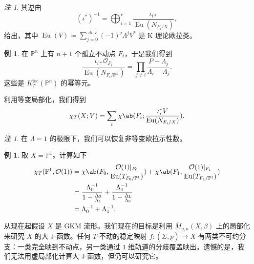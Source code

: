 \documentclass{amsart}
\theoremstyle{definition}
\newtheorem{exm}[thm]{例}
\theoremstyle{remark}
\newtheorem{rmk}[thm]{注}
\theoremstyle{plain}
\theoremstyle{definition}
\theoremstyle{remark}
\renewcommand{\P}{\mathbb{P}}
\newcommand{\mc}[1]{\mathcal{#1}}
\newcommand{\mr}[1]{\mathrm{#1}}
\newcommand{\on}[1]{\operatorname{#1}}
\newcommand{\ul}[1]{\underline{#1}}
\newcommand{\1}{\mathbf{1}}
\newcommand{\2}{\mathbf{2}}
\newcommand{\3}{\mathbf{3}}
\newcommand{\loc}{\mr{loc}}
\begin{document}
\begin{rmk}
    其逆由
    \[ (\iota^*)^{-1} = \bigoplus_{i=1}^r \frac{\iota_{i*}}{\on{Eu}(N_{F_i/X})}, \]
    给出，其中 \(\on{Eu}(V) \coloneqq \sum_{j = 0}^{\on{rk} V} (-1)^j \Lambda^j V^*\) 是 K 理论欧拉类。
\end{rmk}

\begin{exm}
    在 \(\P^n\) 上有 \(n+1\) 个孤立不动点 \(F_i\)，于是我们得到
    \[ \frac{\iota_{i*} \mc{O}_{F_i}}{\on{Eu}(N_{F_i/\P^n})} = \prod_{j \neq i} \frac{P - \Lambda_j}{\Lambda_i - \Lambda_j}. \]
    这些是 \(K_T^{\loc}(\P^n)\) 的幂等元。
\end{exm}

利用等变局部化，我们得到
\[ \chi_T(X; V) = \sum_i \chi\ab(F_i; \frac{\iota_i^* V}{\on{Eu}(N_{F_i/X})}). \]

\begin{rmk}
    在 \(\Lambda = 1\) 的极限下，我们可以恢复非等变欧拉示性数。
\end{rmk}

\begin{exm}
    取 \(X = \P^1\)。计算如下
    \begin{align*}
        \chi_T(\P^1, \mc{O}(1)) &= \chi\ab(F_0, \frac{\mc{O}(1)|_{F_0}}{\on{Eu}(T_{F_0/\P^1})}) + \chi\ab(F_1, \frac{\mc{O}(1)|_{F_1}}{\on{Eu}(T_{F_1/\P^1})}) \\
        &= \frac{\Lambda_0^{-1}}{1 - \frac{\Lambda_0}{\Lambda_1}} + \frac{\Lambda_1^{-1}}{1 - \frac{\Lambda_1}{\Lambda_0}} \\
        &= \Lambda_0^{-1} + \Lambda_1^{-1}. 
    \end{align*}
\end{exm}

从现在起假设 \(X\) 是 GKM 流形。我们现在的目标是利用 \(\bar{M}_{g,n}(X, \beta)\) 上的局部化来研究 \(X\) 的大 J-函数。任何 \(T\)-不动的稳定映射 \(f \colon (\Sigma, \ul{p}) \to X\) 有两类不可约分支：一类完全映到不动点，另一类通过 \(1\) 维轨道的分歧覆盖映出。遗憾的是，我们无法用虚局部化计算大 J-函数，但仍可以研究它。
\end{document}

